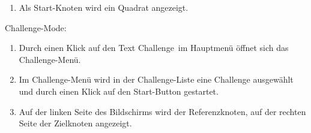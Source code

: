 \begin{description}
\begin{enumerate}
		\item Als Start-Knoten wird ein Quadrat angezeigt.\\
	
	\end{enumerate}
	
	Challenge-Mode:\\
	
	\begin{enumerate}
	
		\item Durch einen Klick auf den Text \glqq Challenge\grqq~im Hauptmenü öffnet sich das Challenge-Menü.
		
		\item Im Challenge-Menü wird in der Challenge-Liste eine Challenge ausgewählt und durch einen Klick auf den Start-Button gestartet.
		
		\item Auf der linken Seite des Bildschirms wird der Referenzknoten, auf der rechten Seite der Zielknoten angezeigt.
	
	\end{enumerate}
	~\\

	
\end{description}









